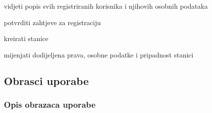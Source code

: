 \begin{packed_enum}
				\begin{packed_enum}
					
					\item vidjeti popis svih registriranih korisnika i njihovih osobnih podataka
					\item potvrditi zahtjeve za registraciju
					\item kreirati stanice
					\item mijenjati dodijeljena prava, osobne podatke i pripadnost stanici
					
				\end{packed_enum}
			\end{packed_enum}
			
			\eject 
			
			
				
			\subsection{Obrasci uporabe}
				
				\subsubsection{Opis obrazaca uporabe}
				
					

